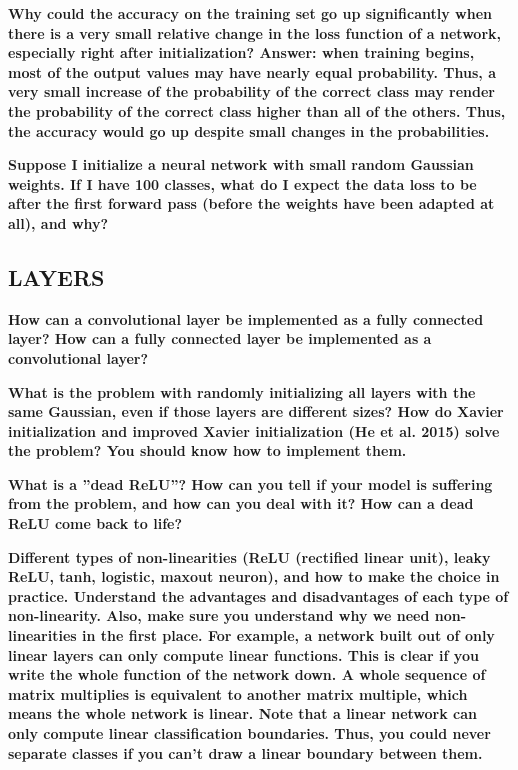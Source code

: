 \documentclass[10pt,letterpaper]{article}
\begin{document}
\subitem \textbf{ Why could the accuracy on the training set go up significantly when there is a very small relative change in the loss function of a network, especially right after initialization? 
\subsubitem Answer: when training begins, most of the output values may have nearly equal probability. Thus, a very small increase of the probability of the correct class may render the probability of the correct class higher than all of the others. Thus, the accuracy would go up despite small changes in the probabilities.}
\begin{solution}
\end{solution}

\subitem \textbf{ Suppose I initialize a neural network with small random Gaussian weights. If I have 100 classes, what do I expect the data loss to be after the first forward pass (before the weights have been adapted at all), and why?}
\begin{solution}
\end{solution}

\subsection{LAYERS}


\subitem \textbf{ How can a convolutional layer be implemented as a fully connected layer? How can a fully connected layer be implemented as a convolutional layer?}
\begin{solution}
\end{solution}

\subitem \textbf{ What is the problem with randomly initializing all layers with the same Gaussian, even if those layers are different sizes? How do Xavier initialization and improved Xavier initialization (He et al. 2015) solve the problem? You should know how to implement them.}
\begin{solution}
\end{solution}

\subitem \textbf{ What is a ”dead ReLU”? How can you tell if your model is suffering from the problem, and how can you deal with it? How can a dead ReLU come back to life?}
\begin{solution}
\end{solution}

\subitem \textbf{ Different types of non-linearities (ReLU (rectified linear unit), leaky ReLU, tanh, logistic, maxout neuron), and how to make the choice in practice. Understand the advantages and disadvantages of each type of non-linearity. Also, make sure you understand why we need non-linearities in the first place. For example, a network built out of only linear layers can only compute linear functions. This is clear if you write the whole function of the network down. A whole sequence of matrix multiplies is equivalent to another matrix multiple, which means the whole network is linear. Note that a linear network can only compute linear classification boundaries. Thus, you could never separate classes if you can’t draw a linear boundary between them.}
\begin{solution}
\end{solution}
\end{document}
